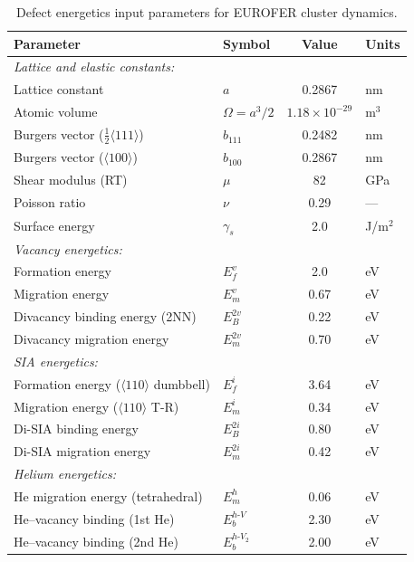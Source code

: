 \documentclass[pdflatex,sn-basic]{sn-jnl} %
\begin{document}
\begin{table}[h!]
\centering
\caption{Defect energetics input parameters for EUROFER cluster dynamics.}
\label{tab:energy_params}
\renewcommand{\arraystretch}{1.15}
\begin{tabular}{@{}llcl@{}}
\toprule
\textbf{Parameter} & \textbf{Symbol} & \textbf{Value} & \textbf{Units} \\
\midrule
\multicolumn{4}{l}{\emph{Lattice and elastic constants:}} \\
Lattice constant & $a$ & 0.2867 & nm \\
Atomic volume & $\Omega = a^3/2$ & $1.18\times10^{-29}$ & m$^3$ \\
Burgers vector ($\frac{1}{2}\langle111\rangle$) & $b_{111}$ & 0.2482 & nm \\
Burgers vector ($\langle100\rangle$) & $b_{100}$ & 0.2867 & nm \\
Shear modulus (RT) & $\mu$ & 82 & GPa \\
Poisson ratio & $\nu$ & 0.29 & --- \\
Surface energy & $\gamma_s$ & 2.0 & J/m$^2$ \\[4pt]

\multicolumn{4}{l}{\emph{Vacancy energetics:}} \\
Formation energy & $E_f^v$ & 2.0 & eV \\
Migration energy & $E_m^v$ & 0.67 & eV \\
Divacancy binding energy (2NN) & $E_B^{2v}$ & 0.22 & eV \\
Divacancy migration energy & $E_m^{2v}$ & 0.70 & eV \\[4pt]

\multicolumn{4}{l}{\emph{SIA energetics:}} \\
Formation energy ($\langle110\rangle$ dumbbell) & $E_f^i$ & 3.64 & eV \\
Migration energy ($\langle110\rangle$ T-R) & $E_m^i$ & 0.34 & eV \\
Di-SIA binding energy & $E_B^{2i}$ & 0.80 & eV \\
Di-SIA migration energy & $E_m^{2i}$ & 0.42 & eV \\[4pt]

\multicolumn{4}{l}{\emph{Helium energetics:}} \\
He migration energy (tetrahedral) & $E_m^h$ & 0.06 & eV \\
He--vacancy binding (1st He) & $E_b^{h\text{-}V}$ & 2.30 & eV \\
He--vacancy binding (2nd He) & $E_b^{h\text{-}V_2}$ & 2.00 & eV \\[4pt]


\end{tabular}
\end{table}
\end{document}
